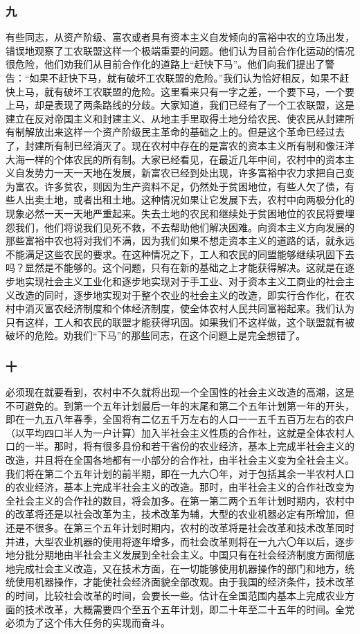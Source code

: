 \documentclass[cn,11pt,chinese]{elegantbook}
\def\myformat#1{\hfil\hfil #1}
\begin{document}
\subsubsection*{\myformat{九}}
有些同志，从资产阶级、富农或者具有资本主义自发倾向的富裕中农的立场出发，错误地观察了工农联盟这样一个极端重要的问题。他们认为目前合作化运动的情况很危险，他们劝我们从目前合作化的道路上“赶快下马”。他们向我们提出了警告：“如果不赶快下马，就有破坏工农联盟的危险。”我们认为恰好相反，如果不赶快上马，就有破坏工农联盟的危险。这里看来只有一字之差，一个要下马，一个要上马，却是表现了两条路线的分歧。大家知道，我们已经有了一个工农联盟，这是建立在反对帝国主义和封建主义、从地主手里取得土地分给农民、使农民从封建所有制解放出来这样一个资产阶级民主革命的基础之上的。但是这个革命已经过去了，封建所有制已经消灭了。现在农村中存在的是富农的资本主义所有制和像汪洋大海一样的个体农民的所有制。大家已经看见，在最近几年中间，农村中的资本主义自发势力一天一天地在发展，新富农已经到处出现，许多富裕中农力求把自己变为富农。许多贫农，则因为生产资料不足，仍然处于贫困地位，有些人欠了债，有些人出卖土地，或者出租土地。这种情况如果让它发展下去，农村中向两极分化的现象必然一天一天地严重起来。失去土地的农民和继续处于贫困地位的农民将要埋怨我们，他们将说我们见死不救，不去帮助他们解决困难。向资本主义方向发展的那些富裕中农也将对我们不满，因为我们如果不想走资本主义的道路的话，就永远不能满足这些农民的要求。在这种情况之下，工人和农民的同盟能够继续巩固下去吗？显然是不能够的。这个问题，只有在新的基础之上才能获得解决。这就是在逐步地实现社会主义工业化和逐步地实现对于手工业、对于资本主义工商业的社会主义改造的同时，逐步地实现对于整个农业的社会主义的改造，即实行合作化，在农村中消灭富农经济制度和个体经济制度，使全体农村人民共同富裕起来。我们认为只有这样，工人和农民的联盟才能获得巩固。如果我们不这样做，这个联盟就有被破坏的危险。劝我们“下马”的那些同志，在这个问题上是完全想错了。\\
\subsubsection*{\myformat{十}}
必须现在就要看到，农村中不久就将出现一个全国性的社会主义改造的高潮，这是不可避免的。到第一个五年计划最后一年的末尾和第二个五年计划第一年的开头，即在一九五八年春季，全国将有二亿五千万左右的人口一一五千五百万左右的农户（以平均四口半人为一户计算）加入半社会主义性质的合作社，这就是全体农村人口的一半。那时，将有很多县份和若干省份的农业经济，基本上完成半社会主义的改造，并且将在全国各地都有一小部分的合作社，由半社会主义变为全社会主义。我们将在第二个五年计划的前半期，即在一九六〇年，对于包括其余一半农村人口的农业经济，基本上完成半社会主义的改造。那时，由半社会主义的合作社改变为全社会主义的合作社的数目，将会加多。在第一第二两个五年计划时期内，农村中的改革将还是以社会改革为主，技术改革为辅，大型的农业机器必定有所增加，但还是不很多。在第三个五年计划时期内，农村的改革将是社会改革和技术改革同时并进，大型农业机器的使用将逐年增多，而社会改革则将在一九六〇年以后，逐步地分批分期地由半社会主义发展到全社会主义。中国只有在社会经济制度方面彻底地完成社会主义改造，又在技术方面，在一切能够使用机器操作的部门和地方，统统使用机器操作，才能使社会经济面貌全部改观。由于我国的经济条件，技术改革的时间，比较社会改革的时间，会要长一些。估计在全国范围内基本上完成农业方面的技术改革，大概需要四个至五个五年计划，即二十年至二十五年的时间。全党必须为了这个伟大任务的实现而奋斗。\\
\end{document}
